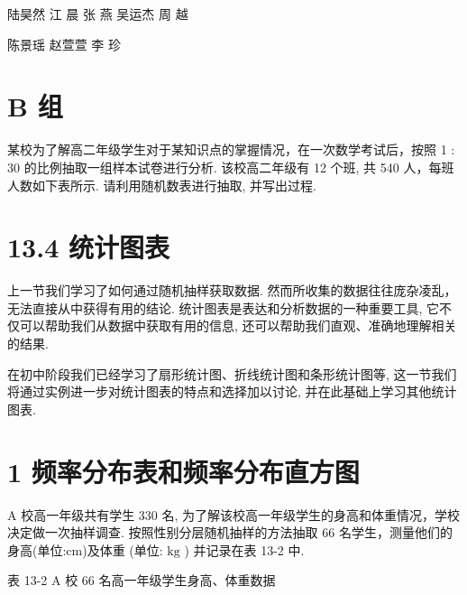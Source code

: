 \documentclass[10pt]{article}
\begin{document}
陆昊然 江 晨 张 燕 吴运杰 周 越

陈景瑶 赵萱萱 李 珍

\section*{B 组}

某校为了解高二年级学生对于某知识点的掌握情况，在一次数学考试后，按照 1 : 30 的比例抽取一组样本试卷进行分析. 该校高二年级有 12 个班, 共 540 人，每班人数如下表所示. 请利用随机数表进行抽取, 并写出过程.

\begin{center}
\end{center}

\section*{13.4 统计图表}

上一节我们学习了如何通过随机抽样获取数据. 然而所收集的数据往往庞杂凌乱，无法直接从中获得有用的结论. 统计图表是表达和分析数据的一种重要工具, 它不仅可以帮助我们从数据中获取有用的信息, 还可以帮助我们直观、准确地理解相关的结果.

在初中阶段我们已经学习了扇形统计图、折线统计图和条形统计图等, 这一节我们将通过实例进一步对统计图表的特点和选择加以讨论, 并在此基础上学习其他统计图表.

\section*{1 频率分布表和频率分布直方图}

A 校高一年级共有学生 330 名, 为了解该校高一年级学生的身高和体重情况，学校决定做一次抽样调查. 按照性别分层随机抽样的方法抽取 66 名学生，测量他们的身高(单位:cm)及体重 (单位: \(\mathrm{{kg}}\) ) 并记录在表 13-2 中.

表 13-2 A 校 66 名高一年级学生身高、体重数据
\end{document}
